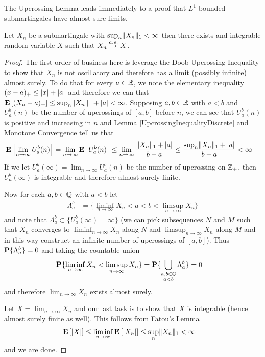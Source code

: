 The Upcrossing Lemma leads immediately to a proof that $L^1$-bounded
submartingales have almost sure limits.
\begin{thm}\label{MartingaleConvergenceBoundedL1Discrete}Let $X_n$ be a submartingale with $\sup_n \lVert X_n \rVert_1 <
  \infty$ then there exists and integrable random variable $X$ such
  that $X_n \overset{a.s.}\to X$.
\end{thm}
\begin{proof}
The first order of business here is leverage the Doob Upcrossing
Inequality to show that $X_n$ is not oscillatory and therefore has a limit (possibly infinite) almost
surely.  To do that for every $a \in \mathbb{R}$, we note the elementary inequality $(x - a)_+ \leq
\left \vert x \right \vert + \left \vert a \right \vert$ and therefore we can that $\textbf{E}\left[(X_n -
  a)_+\right] \leq \sup_n \lVert X_n \rVert_1 + \left \vert a \right \vert< \infty$.
Supposing $a,b \in \mathbb{R}$ with $a<b$ and $U_a^b(n)$ be the number of upcrossings of $[a,b]$ before $n$,
we can see that $U_a^b(n)$ is positive and increasing in $n$ and Lemma
\ref{UpcrossingInequalityDiscrete} and Monotone Convergence tell us
that 
\begin{align*}
\textbf{E}\left[\lim_{n \to \infty} U_a^b(n)\right] &= \lim_{n \to \infty}
\textbf{E}\left[U_a^b(n)\right] \leq 
\lim_{n \to \infty} \frac{\lVert X_n \rVert_1 + \left \vert a \right \vert}{b-a} \leq 
\frac{\sup_n \lVert X_n \rVert_1 + \left \vert a \right \vert}{b-a} < \infty
\end{align*}
If we let $U_a^b(\infty) = \lim_{n \to \infty} U_a^b(n)$ be the number
of upcrossing on $\mathbb{Z}_+$, then
$U_a^b(\infty)$ is integrable and therefore almost
surely finite.

Now for each $a,b \in \mathbb{Q}$ with $a<b$ let 
\begin{align*}
\Lambda_a^b &=
\lbrace \liminf_{n \to \infty} X_n < a < b < \limsup_{n \to
  \infty} X_n \rbrace
\end{align*}
and note that $\Lambda_a^b \subset \lbrace U_a^b(\infty)
= \infty \rbrace$ (we can pick subsequences $N$ and $M$ such that
$X_n$ converges to $\liminf_{n \to \infty} X_n$ along $N$ and 
$\limsup_{n \to  \infty} X_n$ along $M$ and in this way construct an
infinite number of upcrossings of $[a,b]$).  Thus
$\textbf{P}\{\Lambda_a^b\} = 0$ and taking the countable union
\begin{align*}
\textbf{P}\{\liminf_{n \to \infty} X_n < \limsup_{n \to  \infty} X_n\}
&= \textbf{P}\{\bigcup_{
\substack{
a,b \in \mathbb{Q} \\
a<b
}} \Lambda_a^b\} = 0
\end{align*}
and therefore $\lim_{n \to \infty} X_n$ exists almost surely.

Let $X = \lim_{n \to \infty} X_n$ and our last task is to show that
$X$ is integrable (hence almost surely finite as well).  This follows
from Fatou's Lemma
\begin{align*}
\textbf{E}\left[\left \vert X \right \vert\right] &\leq \liminf_{n \to \infty}
\textbf{E}\left[\left \vert X_n  \right \vert\right] \leq \sup_n \lVert X_n \rVert_1 < \infty
\end{align*}
and we are done.
\end{proof} 
